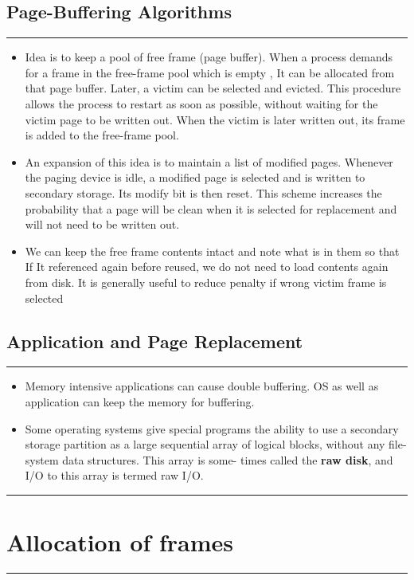 \documentclass[12pt,onecolumn]{IEEEtran}
\begin{document}
\subsection{Page-Buffering Algorithms}
\hrule
\vspace{3mm}
\begin{itemize}
	\item Idea is to keep a pool of free frame (page buffer). When a process demands for a frame in the free-frame pool which is empty , It can be allocated from that page buffer. Later, a victim can be selected and evicted. This
	procedure allows the process to restart as soon as possible, without waiting for the victim page to be written out. When the victim is later written out, its frame
	is added to the free-frame pool.
	\item An expansion of this idea is to maintain a list of modified pages. Whenever
	the paging device is idle, a modified page is selected and is written to secondary
	storage. Its modify bit is then reset. This scheme increases the probability that
	a page will be clean when it is selected for replacement and will not need to be
	written out.
	\item We can keep the free frame contents intact and note what is in them so that If It referenced again before reused, we do not need to load contents
	again from disk. It is generally useful to reduce penalty if wrong victim frame is selected
\end{itemize}
\subsection{Application and Page Replacement}
\hrule
\vspace{3mm}

\begin{itemize}
	\item Memory intensive applications can cause double buffering. OS as well as application can keep the memory for buffering.
	\item Some operating systems give special programs
	the ability to use a secondary storage partition as a large sequential array of
	logical blocks, without any file-system data structures. This array is some-
	times called the \textbf{raw disk}, and I/O to this array is termed raw I/O.
\end{itemize}
\rule{\textwidth}{0.4mm}  
\section{Allocation of frames}
\rule{\textwidth}{0.4mm}  
\end{document}

